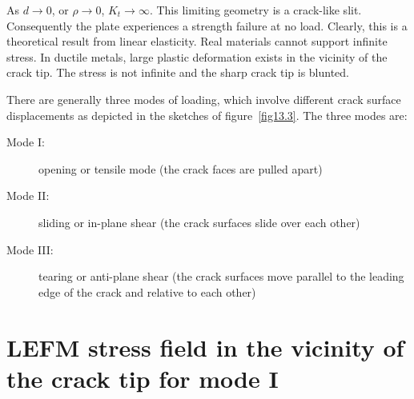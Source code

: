 \documentclass{AeroStructure-ERJohnson}
\begin{document}
As $d\rightarrow 0$, or $\rho\rightarrow 0$, $K_{t}\rightarrow \infty$. This limiting geometry is a crack-like slit. Consequently the plate experiences a strength failure at no load. Clearly, this is a theoretical result from linear elasticity. Real materials\vadjust{\vspace*{6pt}\pagebreak} cannot support infinite stress. In ductile metals, large plastic deformation exists in the vicinity of the crack tip. The stress is not infinite and the sharp crack tip is blunted.

There are generally three modes of loading, which involve different crack surface displacements as depicted in the sketches of figure~\ref{fig13.3}. The three modes are:\vspace*{-6.9pt}
\begin{description}
\item[Mode I:] opening or tensile mode (the crack faces are pulled apart)
\item[Mode II:] sliding or in-plane shear (the crack surfaces slide over each other)
\item[Mode III:] tearing or anti-plane shear (the crack surfaces move parallel to the leading edge of the crack and relative to each other)
\end{description}

\vspace*{-12pt}


\vspace*{-1pc}

\section{LEFM stress field in the vicinity of the crack tip for mode I}\label{sec13.3}
\end{document}
